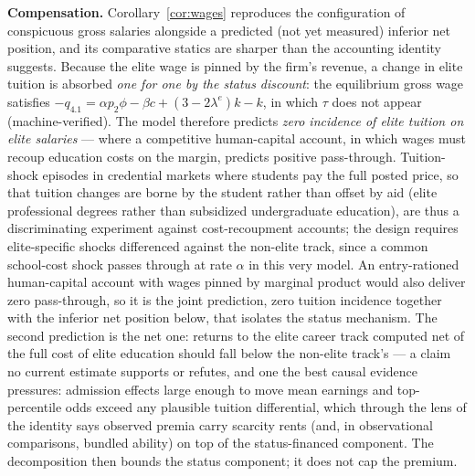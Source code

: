 \documentclass[12pt,letterpaper]{article}
\theoremstyle{definition}
\begin{document}
\textbf{Compensation.}
Corollary~\ref{cor:wages} reproduces the configuration of conspicuous gross salaries alongside a predicted (not yet measured) inferior net position, and its comparative statics are sharper than the accounting identity suggests.
Because the elite wage is pinned by the firm's revenue, a change in elite tuition is absorbed \emph{one for one by the status discount}: the equilibrium gross wage satisfies $-q_{4.1}=\alpha p_2\phi-\beta c+(3-2\lambda^e)k-k$, in which $\tau$ does not appear (machine-verified).
The model therefore predicts \emph{zero incidence of elite tuition on elite salaries} --- where a competitive human-capital account, in which wages must recoup education costs on the margin, predicts positive pass-through.
Tuition-shock episodes in credential markets where students pay the full posted price, so that tuition changes are borne by the student rather than offset by aid (elite professional degrees rather than subsidized undergraduate education), are thus a discriminating experiment against cost-recoupment accounts; the design requires elite-specific shocks differenced against the non-elite track, since a common school-cost shock passes through at rate $\alpha$ in this very model.
An entry-rationed human-capital account with wages pinned by marginal product would also deliver zero pass-through, so it is the joint prediction, zero tuition incidence together with the inferior net position below, that isolates the status mechanism.
The second prediction is the net one: returns to the elite career track computed net of the full cost of elite education should fall below the non-elite track's --- a claim no current estimate supports or refutes, and one the best causal evidence pressures: admission effects large enough to move mean earnings \citep{chettydemingfriedman2026} and top-percentile odds \citep{zimmerman2019elite} exceed any plausible tuition differential, which through the lens of the identity says observed premia carry scarcity rents (and, in observational comparisons, bundled ability) on top of the status-financed component.
The decomposition then bounds the status component; it does not cap the premium.
\end{document}

